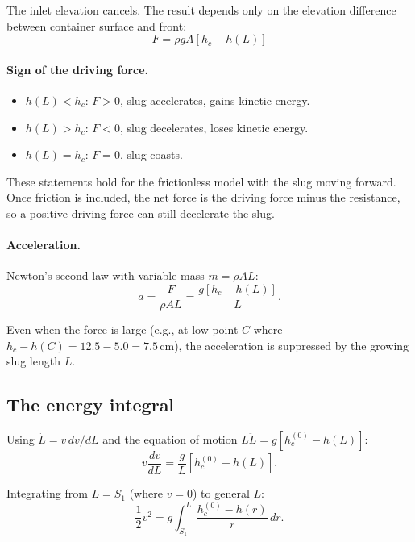 \documentclass[11pt]{article}
\begin{document}
The inlet elevation cancels. The result depends only on the elevation difference between container surface and front:
\begin{equation}
  \boxed{F = \rho g A [h_c - h(L)]}
  \label{eq:driving-force-boxed}
\end{equation}

\paragraph{Sign of the driving force.}
\begin{itemize}[nosep,leftmargin=2em]
  \item $h(L) < h_c$: $F > 0$, slug accelerates, gains kinetic energy.
  \item $h(L) > h_c$: $F < 0$, slug decelerates, loses kinetic energy.
  \item $h(L) = h_c$: $F = 0$, slug coasts.
\end{itemize}
These statements hold for the frictionless model with the slug moving forward. Once friction is included, the net force is the driving force minus the resistance, so a positive driving force can still decelerate the slug.

\paragraph{Acceleration.} Newton's second law with variable mass $m = \rho A L$:
\begin{equation}
  a = \frac{F}{\rho A L} = \frac{g[h_c - h(L)]}{L}.
  \label{eq:acceleration}
\end{equation}

Even when the force is large (e.g., at low point $C$ where $h_c - h(C) = 12.5 - 5.0 = 7.5$\,cm), the acceleration is suppressed by the growing slug length $L$.

\subsection{The energy integral}

Using $\ddot{L} = v \, dv/dL$ and the equation of motion $L \ddot{L} = g[h_c^{(0)} - h(L)]$:
\begin{equation}
  v \frac{dv}{dL} = \frac{g}{L}[h_c^{(0)} - h(L)].
  \label{eq:v-dv-dL}
\end{equation}

Integrating from $L = S_1$ (where $v = 0$) to general $L$:
\[
  \frac{1}{2}v^2 = g \int_{S_1}^{L} \frac{h_c^{(0)} - h(r)}{r} \, dr.
\]
\end{document}

